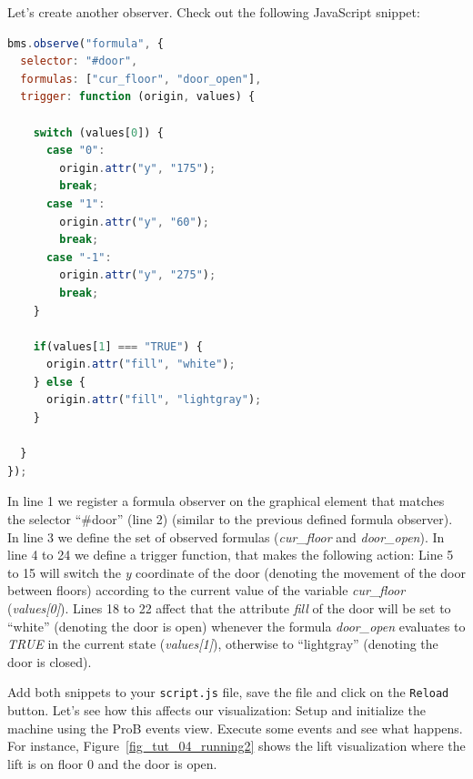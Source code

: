 Let's create another observer.
Check out the following JavaScript snippet:

\begin{lstlisting}[language=JavaScript, caption={Formula Observer for the Lift Door (JavaScript)}]
bms.observe("formula", {
  selector: "#door",
  formulas: ["cur_floor", "door_open"],
  trigger: function (origin, values) {
    
    switch (values[0]) {
      case "0":
        origin.attr("y", "175");
        break;
      case "1":
        origin.attr("y", "60");
        break;
      case "-1":
        origin.attr("y", "275");
        break;
    }
    
    if(values[1] === "TRUE") {
      origin.attr("fill", "white");
    } else {
      origin.attr("fill", "lightgray");
    }
    
  }
});
\end{lstlisting}

In line 1 we register a formula observer on the graphical element that matches the selector ``\#door'' (line 2) (similar to the previous defined formula observer).
In line 3 we define the set of observed formulas (\textit{cur\_floor} and \textit{door\_open}).
In line 4 to 24 we define a trigger function, that makes the following action:
Line 5 to 15 will switch the \textit{y} coordinate of the door (denoting the movement of the door between floors) according to the current value of the variable \textit{cur\_floor} (\textit{values[0]}).
Lines 18 to 22 affect that the attribute \textit{fill} of the door will be set to ``white'' (denoting the door is open) whenever the formula \textit{door\_open} evaluates to \textit{TRUE} in the current state (\textit{values[1]}), otherwise to ``lightgray'' (denoting the door is closed).

Add both snippets to your \texttt{script.js} file, save the file and click on the \texttt{Reload} button.
Let's see how this affects our visualization:
Setup and initialize the machine using the ProB events view.
Execute some events and see what happens.
For instance, Figure~\ref{fig_tut_04_running2} shows the lift visualization where the lift is on floor 0 and the door is open.

